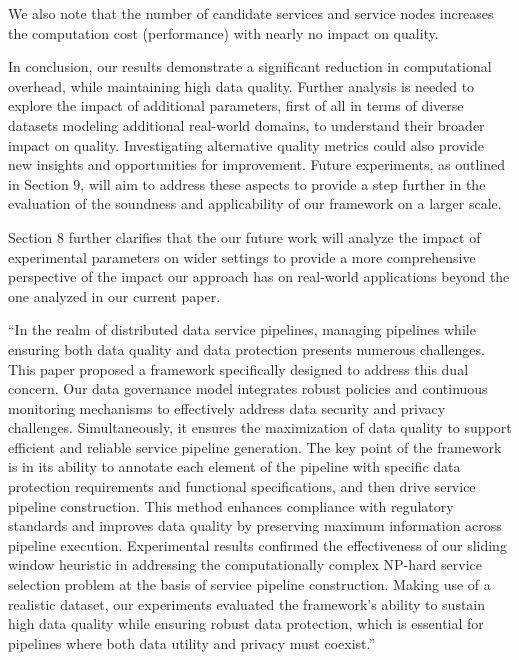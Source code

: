 {\begin{adjustwidth}{10pt}{10pt}
{We also note that the number of candidate services and service nodes increases the computation cost (performance) with nearly no impact on quality.

  In conclusion, our results demonstrate a significant reduction in computational overhead, while
  maintaining high data quality. Further analysis is needed to explore the impact of additional parameters, first of all in terms of diverse datasets modeling additional real-world domains, to understand their broader impact on quality. Investigating alternative quality metrics could also provide new insights and opportunities for improvement. Future experiments, as outlined in Section 9, will aim to address these aspects to provide a step further in the evaluation of the soundness and applicability of our framework on a larger scale.
}
\end{adjustwidth}

    \vspace{0.5em}
    
Section 8 further clarifies that the our future work will analyze the impact of experimental parameters on wider settings to provide a more comprehensive perspective of the impact our approach has on real-world applications beyond the one analyzed in our current paper.

 \begin{adjustwidth}{10pt}{10pt}
        ``{\color{OurColor}In the realm of distributed data service pipelines, managing pipelines while ensuring both data quality and data protection presents numerous challenges. This paper proposed a framework specifically designed to address this dual concern. 
Our data governance model integrates robust policies and continuous monitoring mechanisms to effectively address data security and privacy challenges. Simultaneously, it ensures the maximization of data quality to support efficient and reliable service pipeline generation. The key point of the framework is in its ability to annotate each element of the pipeline with specific data protection requirements and functional specifications, and then drive service pipeline construction. This method enhances compliance with regulatory standards and improves data quality by preserving maximum information across pipeline execution. Experimental results confirmed the effectiveness of our sliding window heuristic in addressing the computationally complex NP-hard service selection problem at the basis of service pipeline construction. Making use of a realistic dataset, our experiments evaluated the framework's ability to sustain high data quality while ensuring robust data protection, which is essential for pipelines where both data utility and privacy must coexist.}''
    \end{adjustwidth}

~}

